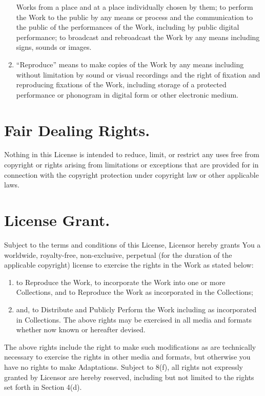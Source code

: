 \begin{enumerate}
       Works from a place and at a place individually chosen by them; to
       perform the Work to the public by any means or process and the
       communication to the public of the performances of the Work,
       including by public digital performance; to broadcast and
       rebroadcast the Work by any means including signs, sounds or
       images.
 \item ``Reproduce'' means to make copies of the Work by any means
       including without limitation by sound or visual recordings and
       the right of fixation and reproducing fixations of the Work,
       including storage of a protected performance or phonogram in
       digital form or other electronic medium.
\end{enumerate}


\section{Fair Dealing Rights.}
Nothing in this License is intended to reduce, limit, or restrict any
uses free from copyright or rights arising from limitations or
exceptions that are provided for in connection with the copyright
protection under copyright law or other applicable laws.


\section{License Grant.}
Subject to the terms and conditions of this License, Licensor hereby
grants You a worldwide, royalty-free, non-exclusive, perpetual (for the
duration of the applicable copyright) license to exercise the rights in
the Work as stated below:
\begin{enumerate}
 \item to Reproduce the Work, to incorporate the
       Work into one or more Collections, and to Reproduce the Work as
       incorporated in the Collections;
 \item and, to Distribute and Publicly
       Perform the Work including as incorporated in Collections. The
       above rights may be exercised in all media and formats whether
       now known or hereafter devised.
\end{enumerate}
The above rights include the right to make such modifications as are
technically necessary to exercise the rights in other media and formats,
but otherwise you have no rights to make Adaptations. Subject to 8(f),
all rights not expressly granted by Licensor are hereby reserved,
including but not limited to the rights set forth in Section 4(d).


